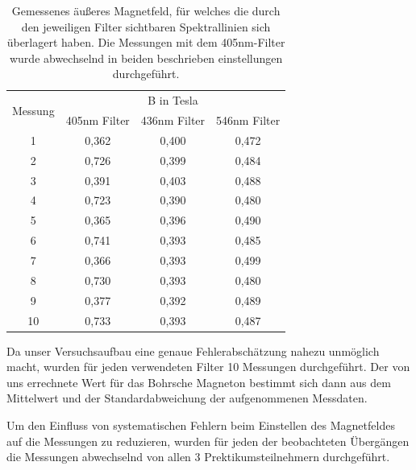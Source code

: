 \documentclass[bigchapter,colorback,accentcolor=tud4b,linedtoc,11pt]{tudreport}
\begin{document}
\begin{table}[H]
  \begin{center}
  \begin{tabular}{|c|c|c|c|}
    \hline
    \multirow{2}{*}{Messung} & \multicolumn{3}{c|}{B in Tesla}     \\ \cline{2-4}
                             & 405nm Filter & 436nm Filter & 546nm Filter
                                                                   \\ \hline 
    1                        & 0,362        & 0,400        & 0,472 \\ \hline
    2                        & 0,726        & 0,399        & 0,484 \\ \hline
    3                        & 0,391        & 0,403        & 0,488 \\ \hline
    4                        & 0,723        & 0,390        & 0,480 \\ \hline
    5                        & 0,365        & 0,396        & 0,490 \\ \hline
    6                        & 0,741        & 0,393        & 0,485 \\ \hline
    7                        & 0,366        & 0,393        & 0,499 \\ \hline
    8                        & 0,730        & 0,393        & 0,480 \\ \hline
    9                        & 0,377        & 0,392        & 0,489 \\ \hline
    10                       & 0,733        & 0,393        & 0,487 \\ \hline
	\end{tabular}
    \caption{Gemessenes äußeres Magnetfeld, für welches die durch den jeweiligen
    Filter sichtbaren Spektrallinien sich überlagert haben. Die Messungen mit
    dem 405nm-Filter wurde abwechselnd in beiden beschrieben einstellungen
    durchgeführt.}
  \end{center}
\end{table}

Da unser Versuchsaufbau eine genaue Fehlerabschätzung nahezu unmöglich macht,
wurden für jeden verwendeten Filter 10 Messungen durchgeführt. Der von uns
errechnete Wert für das Bohrsche Magneton bestimmt sich dann aus dem Mittelwert
und der Standardabweichung der aufgenommenen Messdaten.

Um den Einfluss von systematischen Fehlern beim Einstellen des Magnetfeldes auf
die Messungen zu reduzieren, wurden für jeden der beobachteten Übergängen die
Messungen abwechselnd von allen 3 Prektikumsteilnehmern durchgeführt.
\end{document}
